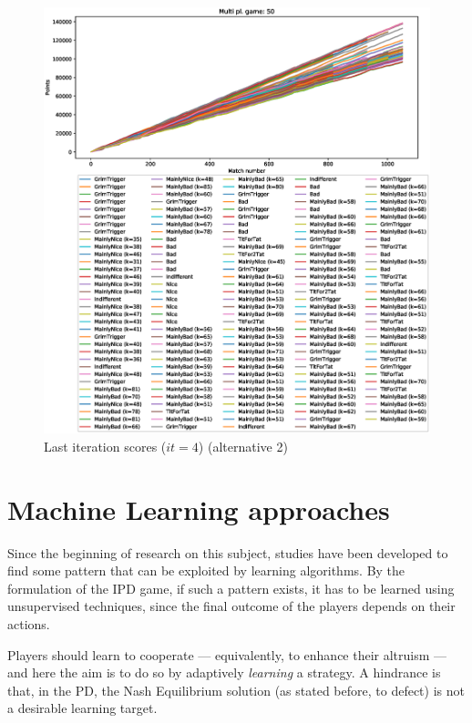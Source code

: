 \documentclass[journal,10pt,twoside]{IEEEtran}
\begin{document}
\begin{figure}[!ht]
    \centering
    \includegraphics[width=1\columnwidth]{../img/cipdmp-incr/alt2/cipdmp-scores-increasing-pop-50-r4}
    \caption{Last iteration scores ($it=4$) (alternative 2)}
    \label{fig:incrCLI2}
\end{figure}

\section{Machine Learning approaches} \label{s:ml}
Since the beginning of research on this subject, studies have been developed to find some pattern that can be exploited by learning algorithms.
By the formulation of the IPD game, if such a pattern exists, it has to be learned using unsupervised techniques, since the final outcome of the players depends on their actions.

Players should learn to cooperate --- equivalently, to enhance their altruism --- and here the aim is to do so by adaptively \textit{learning} a strategy. A hindrance is that, in the PD, the Nash Equilibrium solution (as stated before, to defect) is not a desirable learning target.~\cite{coopSeqRL}
\end{document}
